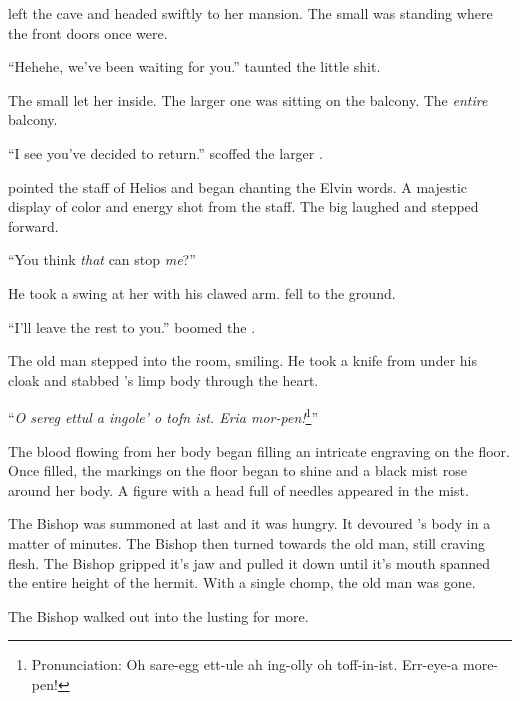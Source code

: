 
\noindent
\april{} left the cave and headed swiftly to her mansion.
The small \creaturename{} was standing where the front doors once were.
\VV


``Hehehe, we've been waiting for you.'' taunted the little shit.
\VV


\noindent
The small \creaturename{} let her inside.
The larger one was sitting on the balcony.
The \textit{entire} balcony.
\VV


``I see you've decided to return.'' scoffed the larger \creaturename{}.
\VV


\noindent
\april{} pointed the staff of Helios and began chanting the Elvin words.
A majestic display of color and energy shot from the staff.
The big \creaturename{} laughed and stepped forward.
\VV


``You think \textit{that} can stop \textit{me}?''
\VV


\noindent
He took a swing at her with his clawed arm.
\april{} fell to the ground.
\VV


``I'll leave the rest to you.'' boomed the \creaturename.
\VV


The old man stepped into the room, smiling.
He took a knife from under his cloak and stabbed
\april{}'s limp body through the heart.
\VV


``\textit{O sereg ettul a ingole' o tofn ist. Eria mor-pen!}\footnote{
Pronunciation:
Oh sare-egg ett-ule ah ing-olly oh toff-in-ist.
Err-eye-a more-pen!
}''
\VV


\noindent
The blood flowing from her body began filling an intricate
engraving on the floor.
Once filled, the markings on the floor began to shine and a
black mist rose around her body.
A figure with a head full of needles appeared in the mist.


The Bishop was summoned at last and it was hungry.
It devoured \april's body in a matter of minutes.
The Bishop then turned towards the old man, still craving flesh.
The Bishop gripped it's jaw and pulled it down until it's mouth
spanned the entire height of the hermit.
With a single chomp, the old man was gone.


The Bishop walked out into the lusting for more.
